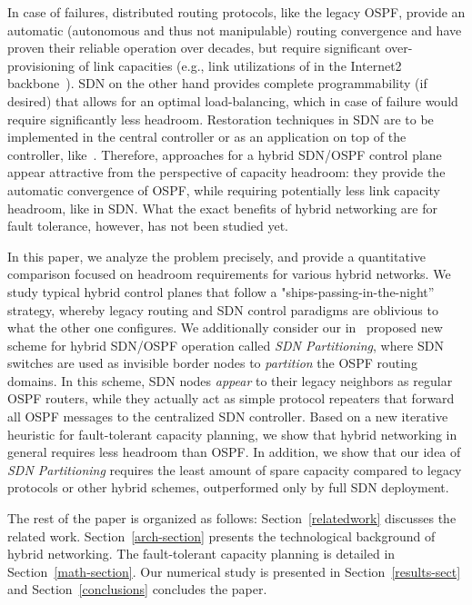 \documentclass[10pt, conference]{IEEEtran}
\begin{document}
\par In case of failures, distributed routing protocols, like the legacy OSPF, provide an automatic (autonomous and thus not manipulable) routing convergence and have proven their reliable operation over decades, but require significant over-provisioning of link capacities (e.g., link utilizations of  in the Internet2 backbone~\cite{internet2}). SDN on the other hand provides complete programmability (if desired) that allows for an optimal load-balancing, which in case of failure would require significantly less headroom. Restoration techniques in SDN are to be implemented in the central controller or as an application on top of the controller, like~\cite{ciena-protect}. Therefore, approaches for a hybrid SDN/OSPF control plane appear attractive from the perspective of capacity headroom: they provide the automatic convergence of OSPF, while requiring potentially less link capacity headroom, like in SDN. What the exact benefits of hybrid networking are for fault tolerance, however, has not been studied yet.

\par In this paper, we analyze the problem precisely, and provide a quantitative comparison focused on headroom requirements for various hybrid networks.  We study typical hybrid control planes that follow a "ships-passing-in-the-night'' strategy, whereby legacy routing and SDN control paradigms are oblivious to what the other one configures. We additionally consider our in~\cite{divideandconquer} proposed new scheme for hybrid SDN/OSPF operation called \emph{SDN Partitioning}, where SDN switches are used as invisible border nodes to \emph{partition} the OSPF routing domains. In this scheme, SDN nodes \emph{appear} to their legacy neighbors as regular OSPF routers, while they actually act as simple protocol repeaters that forward all OSPF messages to the centralized SDN controller. Based on a new iterative heuristic for fault-tolerant capacity planning, we show that hybrid networking in general requires less headroom than OSPF. In addition, we show that our idea of \emph{SDN Partitioning} requires the least amount of spare capacity compared to legacy protocols or other hybrid schemes, outperformed only by full SDN deployment.

\par The rest of the paper is organized as follows: Section~\ref{relatedwork} discusses the related work. Section~\ref{arch-section} presents the technological background of hybrid networking. The fault-tolerant capacity planning is detailed in Section~\ref{math-section}. Our numerical study is presented in Section~\ref{results-sect} and Section~\ref{conclusions} concludes the paper. 
\end{document}
